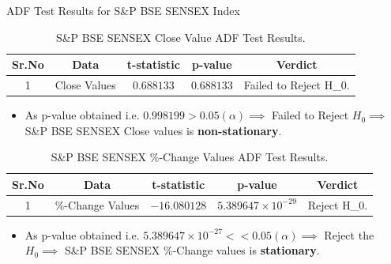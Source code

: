\documentclass{beamer}
\begin{document}
\begin{frame}{ADF Test Results for S\&P BSE SENSEX Index}
	\begin{table}
		\begin{tabular}{c{0.5cm} c{1cm} c c c}
			\textbf{Sr.No} & \textbf{Data} & \textbf{t-statistic} & \textbf{p-value} & \textbf{Verdict}        \\
			\midrule
			1              & Close Values  & $0.688133$           & $0.688133$       & Failed to Reject H_{0}. \\
			\bottomrule
		\end{tabular}
		\caption{S\&P BSE SENSEX Close Value ADF Test Results.}
	\end{table}
	\begin{itemize}
		\item As p-value obtained i.e. $0.998199 > 0.05 (\alpha) \implies$ Failed to Reject $H_{0} \implies$ S\&P BSE SENSEX Close values is \textbf{non-stationary}.
	\end{itemize}
	\pause
	\begin{table}[]
		\centering
		\begin{tabular}{c c c c c}
			\textbf{Sr.No} & \textbf{Data}    & \textbf{t-statistic} & \textbf{p-value}           & \textbf{Verdict} \\
			\midrule
			1              & \%-Change Values & $-16.080128$         & $5.389647 \times 10^{-29}$ & Reject H_{0}.    
			\bottomrule
		\end{tabular}
		\caption{S\&P BSE SENSEX \%-Change Values ADF Test Results.}
		\label{tab:my_label}
	\end{table}
	\begin{itemize}
		\item As p-value obtained i.e. $5.389647 \times 10^{-27} << 0.05 (\alpha) \implies$ Reject the $H_{0} \implies$ S\&P BSE SENSEX \%-Change values is \textbf{stationary}.
	\end{itemize}
\end{frame}
\end{document}
